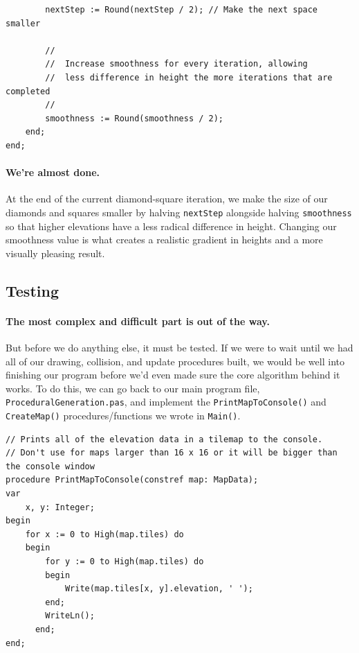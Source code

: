 \documentclass{article}
\begin{document}
\begin{verbatim}
		nextStep := Round(nextStep / 2); // Make the next space smaller

		//
		//	Increase smoothness for every iteration, allowing
		//	less difference in height the more iterations that are completed
		//
		smoothness := Round(smoothness / 2);
	end;
end;
\end{verbatim}

\paragraph{We're almost done.} At the end of the current diamond-square iteration, we make the size of our diamonds and squares smaller by halving \texttt{nextStep} alongside halving \texttt{smoothness} so that higher elevations have a less radical difference in height. Changing our smoothness value is what creates a realistic gradient in heights and a more visually pleasing result.

\subsection{Testing}

\paragraph{The most complex and difficult part is out of the way.}But before we do anything else, it must be tested. If we were to wait until we had all of our drawing, collision, and update procedures built, we would be well into finishing our program before we'd even made sure the core algorithm behind it works. To do this, we can go back to our main program file, \texttt{ProceduralGeneration.pas}, and implement the \texttt{PrintMapToConsole()} and \texttt{CreateMap()} procedures/functions we wrote in \texttt{Main()}.

\begin{verbatim}
// Prints all of the elevation data in a tilemap to the console.
// Don't use for maps larger than 16 x 16 or it will be bigger than the console window
procedure PrintMapToConsole(constref map: MapData);
var
	x, y: Integer;
begin
	for x := 0 to High(map.tiles) do
  	begin
  		for y := 0 to High(map.tiles) do
	  	begin
  			Write(map.tiles[x, y].elevation, ' ');
	  	end;
  		WriteLn();
	  end;
end;
\end{verbatim}
\end{document}
